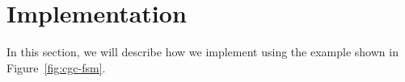 \section{Implementation}
\label{sec:imple}

In this section, we will describe how we implement \Tool{} 
using the example shown in Figure~\ref{fig:cgc-fsm}. 

